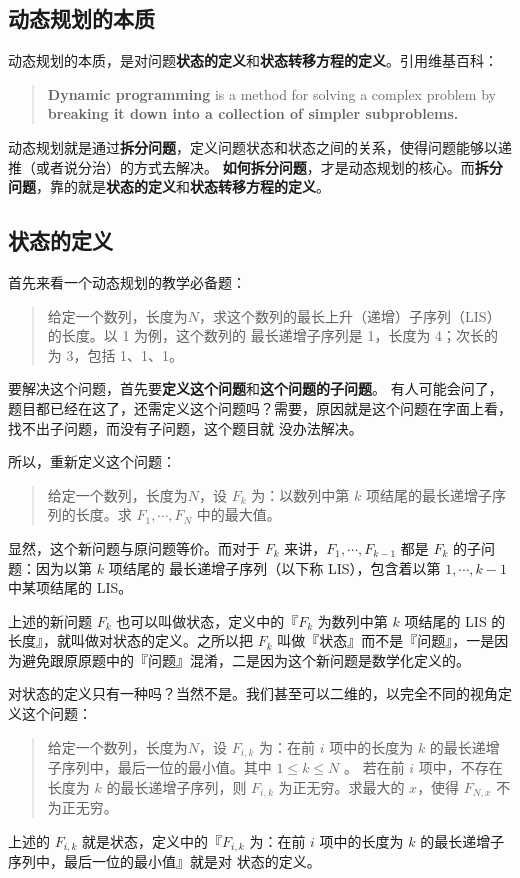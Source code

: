 \subsection{动态规划的本质}

动态规划的本质，是对问题\textbf{状态的定义}和\textbf{状态转移方程的定义}。引用维基百科：
\begin{quotation}
\textbf{Dynamic programming} is a method for solving a complex problem by \textbf{breaking it down
into a collection of simpler subproblems.}
\end{quotation}
动态规划就是通过\textbf{拆分问题}，定义问题状态和状态之间的关系，使得问题能够以递推（或者说分治）的方式去解决。
\textbf{如何拆分问题}，才是动态规划的核心。而\textbf{拆分问题}，靠的就是\textbf{状态的定义}和\textbf{状态转移方程的定义}。

\subsection{状态的定义}

首先来看一个动态规划的教学必备题：
\begin{quotation}
给定一个数列，长度为$N$，求这个数列的最长上升（递增）子序列（LIS）的长度。以 1 为例，这个数列的
最长递增子序列是 1，长度为 4；次长的为 3，包括 1、1、1。
\end{quotation}
要解决这个问题，首先要\textbf{定义这个问题}和\textbf{这个问题的子问题}。
有人可能会问了，题目都已经在这了，还需定义这个问题吗？需要，原因就是这个问题在字面上看，找不出子问题，而没有子问题，这个题目就
没办法解决。

所以，重新定义这个问题：
\begin{quotation}
给定一个数列，长度为$N$，设 $F_{k}$ 为：以数列中第 $k$ 项结尾的最长递增子序列的长度。求 $F_{1}, \cdots, F_{N}$ 中的最大值。
\end{quotation}
显然，这个新问题与原问题等价。而对于 $F_{k}$ 来讲，$F_{1}, \cdots, F_{k-1}$ 都是 $F_{k}$ 的子问题：因为以第 $k$ 项结尾的
最长递增子序列（以下称 LIS），包含着以第 $1, \cdots, k-1$ 中某项结尾的 LIS。

上述的新问题 $F_{k}$ 也可以叫做状态，定义中的『$F_{k}$ 为数列中第 $k$ 项结尾的 LIS 的长度』，就叫做对状态的定义。之所以把 $F_{k}$
叫做『状态』而不是『问题』，一是因为避免跟原原题中的『问题』混淆，二是因为这个新问题是数学化定义的。

对状态的定义只有一种吗？当然不是。我们甚至可以二维的，以完全不同的视角定义这个问题：
\begin{quotation}
给定一个数列，长度为$N$，设 $F_{i, k}$ 为：在前 $i$ 项中的长度为 $k$ 的最长递增子序列中，最后一位的最小值。其中 $1 \leq k \leq N$ 。
若在前 $i$ 项中，不存在长度为 $k$ 的最长递增子序列，则 $F_{i, k}$ 为正无穷。求最大的 $x$，使得 $F_{N, x}$ 不为正无穷。
\end{quotation}
上述的 $F_{i, k}$ 就是状态，定义中的『$F_{i, k}$ 为：在前 $i$ 项中的长度为 $k$ 的最长递增子序列中，最后一位的最小值』就是对
状态的定义。

